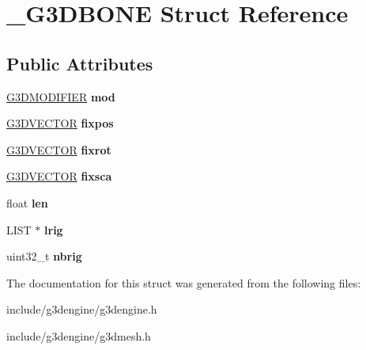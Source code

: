 \hypertarget{struct__G3DBONE}{}\section{\+\_\+\+G3\+D\+B\+O\+NE Struct Reference}
\label{struct__G3DBONE}
\subsection*{Public Attributes}
\begin{DoxyCompactItemize}
\item 
\mbox{\label{struct__G3DBONE_a3badce43095637e14c5c5fe00a914085}} 
\hyperlink{struct__G3DMODIFIER}{G3\+D\+M\+O\+D\+I\+F\+I\+ER} {\bfseries mod}
\item 
\mbox{\label{struct__G3DBONE_aad8ac1cf4da67912f6dbd9b81c7d8fc1}} 
\hyperlink{structG3DVECTOR}{G3\+D\+V\+E\+C\+T\+OR} {\bfseries fixpos}
\item 
\mbox{\label{struct__G3DBONE_aa37f96a50190a503f7504422dc81b1e3}} 
\hyperlink{structG3DVECTOR}{G3\+D\+V\+E\+C\+T\+OR} {\bfseries fixrot}
\item 
\mbox{\label{struct__G3DBONE_a27f68182243132f67bfe87083bfddbb3}} 
\hyperlink{structG3DVECTOR}{G3\+D\+V\+E\+C\+T\+OR} {\bfseries fixsca}
\item 
\mbox{\label{struct__G3DBONE_a311b0ae14c04f1d077c9f5c2dbef0b16}} 
float {\bfseries len}
\item 
\mbox{\label{struct__G3DBONE_afb8e83bd8ba1a503f2510307d96319a1}} 
L\+I\+ST $\ast$ {\bfseries lrig}
\item 
\mbox{\label{struct__G3DBONE_a2e0cd1b20b7fee6ad2bb802a36604eda}} 
uint32\+\_\+t {\bfseries nbrig}
\end{DoxyCompactItemize}


The documentation for this struct was generated from the following files\+:\begin{DoxyCompactItemize}
\item 
include/g3dengine/g3dengine.\+h\item 
include/g3dengine/g3dmesh.\+h\end{DoxyCompactItemize}
